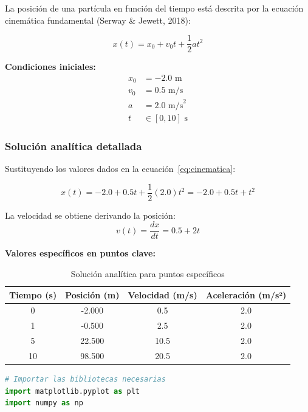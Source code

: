 \documentclass{article}
\begin{document}
\begin{center}
	La posición de una partícula en función del tiempo está descrita por la ecuación cinemática fundamental (Serway \& Jewett, 2018):
	
	\begin{equation}
		x(t) = x_0 + v_0t + \frac{1}{2}at^2
		\label{eq:cinematica}
	\end{equation}
	
	\textbf{Condiciones iniciales:}
	\begin{align}
		x_0 &= -2.0 \text{ m} \\
		v_0 &= 0.5 \text{ m/s} \\
		a &= 2.0 \text{ m/s}^2 \\
		t &\in [0, 10] \text{ s}
	\end{align}
	
	\subsubsection{Solución analítica detallada}
	
	Sustituyendo los valores dados en la ecuación~\ref{eq:cinematica}:
	
	\begin{equation}
		x(t) = -2.0 + 0.5t + \frac{1}{2}(2.0)t^2 = -2.0 + 0.5t + t^2
	\end{equation}
	
	La velocidad se obtiene derivando la posición:
	\begin{equation}
		v(t) = \frac{dx}{dt} = 0.5 + 2t
	\end{equation}
	
	\textbf{Valores específicos en puntos clave:}
	\begin{table}[H]
		\centering
		\caption{Solución analítica para puntos específicos}
		\begin{tabular}{|c|c|c|c|}
			\hline
			\textbf{Tiempo (s)} & \textbf{Posición (m)} & \textbf{Velocidad (m/s)} & \textbf{Aceleración (m/s²)} \\
			\hline
			0 & -2.000 & 0.5 & 2.0 \\
			1 & -0.500 & 2.5 & 2.0 \\
			5 & 22.500 & 10.5 & 2.0 \\
			10 & 98.500 & 20.5 & 2.0 \\
			\hline
		\end{tabular}
	\end{table}
	
	\begin{lstlisting}[language=Python, caption={Implementación de la solución analítica}]
# Importar las bibliotecas necesarias
import matplotlib.pyplot as plt
import numpy as np


\end{lstlisting}
\end{center}
\end{document}
